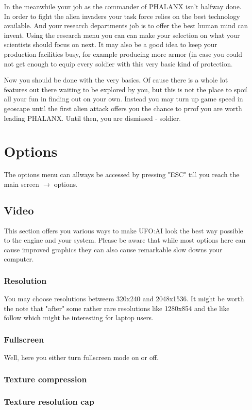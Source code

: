 In the meanwhile your job as the commander of PHALANX isn't halfway done. In order to fight the alien invaders your task force relies on the best technology available. And your research departments job is to offer the best human mind can invent. Using the research menu you can can make your selection on what your scientists should focus on next. It may also be a good idea to keep your production facilities busy, for example producing more armor (in case you could not get enough to equip every soldier with this very basic kind of protection.

Now you should be done with the very basics. Of cause there is a whole lot features out there waiting to be explored by you, but this is not the place to spoil all your fun in finding out on your own. Instead you may turn up game speed in geoscape until the first alien attack offers you the chance to prrof you are worth leading PHALANX. Until then, you are dismissed - soldier.

\section{Options}
The options menu can allways be accessed by pressing "ESC" till you reach the main screen $\rightarrow$ options.

\subsection{Video}
This section offers you various ways to make UFO:AI look the best way possible to the engine and your system. Please be aware that while most options here can cause improved graphics they can also cause remarkable slow downs your computer.
\subsubsection*{Resolution}
You may choose resolutions betweem 320x240 and 2048x1536. It might be worth the note that "after" some rather rare resolutions like 1280x854 and the like follow which might be interesting for laptop users.
\subsubsection*{Fullscreen}
Well, here you either turn fullscreen mode on or off.
\subsubsection*{Texture compression}
\subsubsection*{Texture resolution cap}
